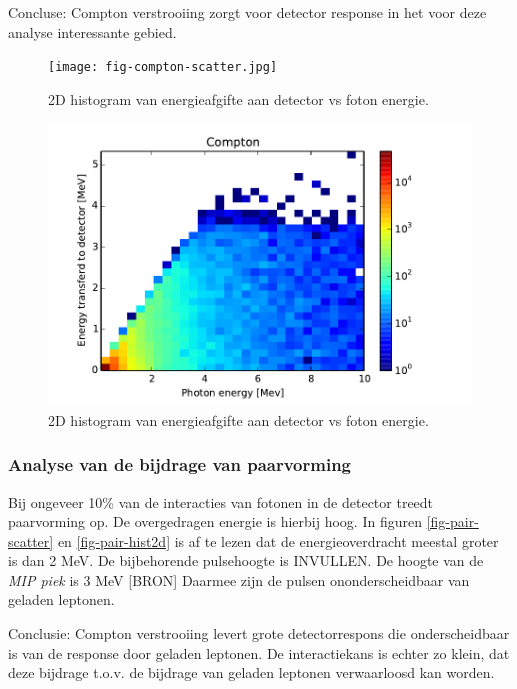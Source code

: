 \documentclass[a4paper,11pt]{article}
\begin{document}
Concluse: Compton verstrooiing zorgt voor detector response in het voor deze analyse interessante gebied.

\begin{figure}[t]
  \begin{center}
    \texttt{[image: fig-compton-scatter.jpg]}
    \caption{\label{fig:compton-scatter} 2D histogram van energieafgifte aan detector vs foton energie.}
  \end{center}
  \begin{center}
    \includegraphics{fig-compton-hist2d.pdf}
    \caption{\label{fig:compton-hist2d} 2D histogram van energieafgifte aan detector vs foton energie.}
  \end{center}
\end{figure}




\subsubsection{Analyse van de bijdrage van paarvorming}
Bij ongeveer 10\% van de interacties van fotonen in de detector treedt paarvorming op. De overgedragen energie is hierbij hoog. In figuren \ref{fig-pair-scatter} en \ref{fig-pair-hist2d} is af te lezen dat de energieoverdracht meestal groter is dan 2 MeV. De bijbehorende pulsehoogte is INVULLEN. De hoogte van de \textit{MIP piek} is 3 MeV [BRON] Daarmee zijn de pulsen ononderscheidbaar van geladen leptonen.

Conclusie: Compton verstrooiing levert grote detectorrespons die onderscheidbaar is van de response door geladen leptonen. De interactiekans is echter zo klein, dat deze bijdrage t.o.v. de bijdrage van geladen leptonen verwaarloosd kan worden.
\end{document}
